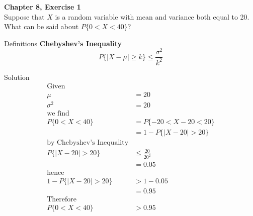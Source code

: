 \documentclass{article}
\begin{document}
\begin{spacing}{1.1}
\maketitle

\newpage
\begin{homeworkProblem}
  {\bf Chapter 8, Exercise 1}\\
  Suppose that $X$ is a random variable with mean and variance 
  both equal to 20. What can be said about $P\{ 0 < X < 40\}$?
  \begin{homeworkSection}{Definitions}
    {\bf Chebyshev's Inequality}\\
      \[P\{ |X - \mu| \ge k\} \le \frac{ \sigma^2}{ k^2}\]
  \end{homeworkSection}
  \begin{homeworkSection}{Solution}
    \begin{align*}
      \text{Given}\\
      \mu &= 20\\
      \sigma^2 &= 20\\
      \text{we find}\\
      P\{ 0 < X < 40\} &= P\{ -20 < X - 20 < 20\}\\
      &= 1 - P\{|X - 20| > 20\} \\
      \text{by Chebyshev's Inequality}\\
      P\{|X - 20| > 20\} &\le \frac{ 20}{ 20^2}\\
      &= 0.05\\
      \text{hence}\\
      1 - P\{|X - 20| > 20\} &> 1 - 0.05\\
      &= 0.95\\
      \text{Therefore}\\
      P\{ 0 < X < 40\} &> 0.95\\
    \end{align*}
  \end{homeworkSection}
\end{homeworkProblem}


\end{spacing}
\end{document}
